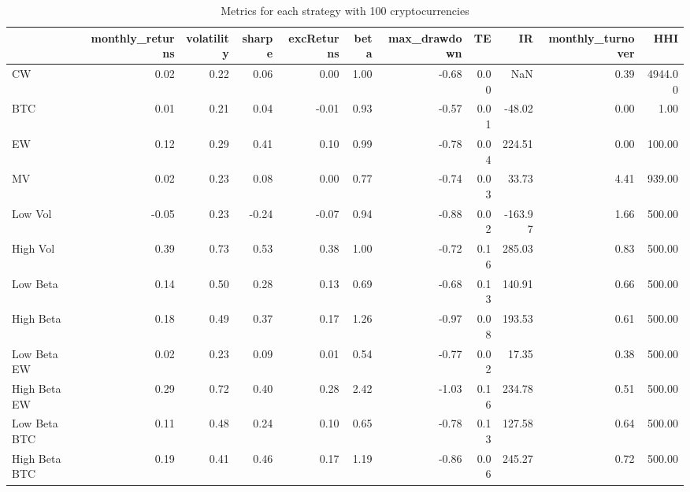 \begin{table}
\centering
\caption{Metrics for each strategy with 100 cryptocurrencies}
\label{metrics100}
\begin{tabular}{lrrrrrrrrrr}
\toprule
{} &  monthly\_returns &  volatility &  sharpe &  excReturns &  beta &  max\_drawdown &   TE &      IR &  monthly\_turnover &     HHI \\
\midrule
CW            &             0.02 &        0.22 &    0.06 &        0.00 &  1.00 &         -0.68 & 0.00 &     NaN &              0.39 & 4944.00 \\
BTC           &             0.01 &        0.21 &    0.04 &       -0.01 &  0.93 &         -0.57 & 0.01 &  -48.02 &              0.00 &    1.00 \\
EW            &             0.12 &        0.29 &    0.41 &        0.10 &  0.99 &         -0.78 & 0.04 &  224.51 &              0.00 &  100.00 \\
MV            &             0.02 &        0.23 &    0.08 &        0.00 &  0.77 &         -0.74 & 0.03 &   33.73 &              4.41 &  939.00 \\
Low Vol       &            -0.05 &        0.23 &   -0.24 &       -0.07 &  0.94 &         -0.88 & 0.02 & -163.97 &              1.66 &  500.00 \\
High Vol      &             0.39 &        0.73 &    0.53 &        0.38 &  1.00 &         -0.72 & 0.16 &  285.03 &              0.83 &  500.00 \\
Low Beta      &             0.14 &        0.50 &    0.28 &        0.13 &  0.69 &         -0.68 & 0.13 &  140.91 &              0.66 &  500.00 \\
High Beta     &             0.18 &        0.49 &    0.37 &        0.17 &  1.26 &         -0.97 & 0.08 &  193.53 &              0.61 &  500.00 \\
Low Beta EW   &             0.02 &        0.23 &    0.09 &        0.01 &  0.54 &         -0.77 & 0.02 &   17.35 &              0.38 &  500.00 \\
High Beta EW  &             0.29 &        0.72 &    0.40 &        0.28 &  2.42 &         -1.03 & 0.16 &  234.78 &              0.51 &  500.00 \\
Low Beta BTC  &             0.11 &        0.48 &    0.24 &        0.10 &  0.65 &         -0.78 & 0.13 &  127.58 &              0.64 &  500.00 \\
High Beta BTC &             0.19 &        0.41 &    0.46 &        0.17 &  1.19 &         -0.86 & 0.06 &  245.27 &              0.72 &  500.00 \\
\bottomrule
\end{tabular}
\end{table}
